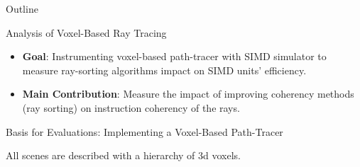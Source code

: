 \documentclass{beamer}
\begin{document}
\begin{frame}{Outline}
\end{frame}

\begin{frame}{Analysis of Voxel-Based Ray Tracing}
	\begin{itemize}
		\item \textbf{Goal}: Instrumenting voxel-based path-tracer with SIMD simulator to measure ray-sorting algorithms impact on SIMD units' efficiency.
		\item  \textbf{Main Contribution}: Measure the impact of improving coherency methods (ray sorting) on instruction coherency of the rays.
	\end{itemize}
\end{frame}

\begin{frame}{Basis for Evaluations: Implementing a Voxel-Based Path-Tracer}
	\begin{figure}
		\centering
	\end{figure}
\begin{center}
    All scenes are described with a hierarchy of 3d voxels.
\end{center}

\end{frame}
\end{document}
